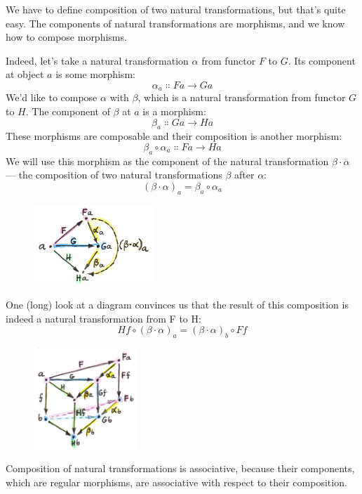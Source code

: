 We have to define composition of two natural transformations, but that's
quite easy. The components of natural transformations are morphisms, and
we know how to compose morphisms.

Indeed, let's take a natural transformation $\alpha$ from functor $F$ to $G$. Its
component at object $a$ is some morphism:
\[\alpha_a \Colon F a \to G a\]
We'd like to compose $\alpha$ with $\beta$, which is a natural transformation from
functor $G$ to $H$. The component of $\beta$ at $a$ is a morphism:
\[\beta_a \Colon G a \to H a\]
These morphisms are composable and their composition is another
morphism:
\[\beta_a \circ \alpha_a \Colon F a \to H a\]
We will use this morphism as the component of the natural transformation
$\beta \cdot \alpha$ --- the composition of two natural transformations $\beta$ after $\alpha$:
\[(\beta \cdot \alpha)_a = \beta_a \circ \alpha_a\]

\begin{figure}[H]
\centering
\includegraphics[width=0.4\textwidth]{images/5_vertical.jpg}
\end{figure}

\noindent
One (long) look at a diagram convinces us that the result of this
composition is indeed a natural transformation from F to H:
\[H f \circ (\beta \cdot \alpha)_a = (\beta \cdot \alpha)_b \circ F f\]

\begin{figure}[H]
\centering
\includegraphics[width=0.35\textwidth]{images/6_verticalnaturality.jpg}
\end{figure}

\noindent
Composition of natural transformations is associative, because their
components, which are regular morphisms, are associative with respect to
their composition.

